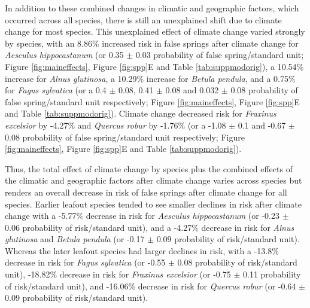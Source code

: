 \documentclass{article}\usepackage[]{graphicx}\usepackage[]{color}
\begin{document}
In addition to these combined changes in climatic and geographic factors, which occurred across all species, there is still an unexplained shift due to climate change for most species. This unexplained effect of climate change varied strongly by species, with an 8.86\% increased risk in false springs after climate change for \textit{Aesculus hippocastanum} (or 0.35 $\pm$ 0.03 probability of false spring/standard unit; Figure \ref{fig:maineffects}, Figure \ref{fig:spp}E and Table \ref{tab:suppmodorig}), a 10.54\% increase for \textit{Alnus glutinosa}, a 10.29\% increase for \textit{Betula pendula}, and a 0.75\% for \textit{Fagus sylvatica} (or a 0.4 $\pm$ 0.08, 0.41 $\pm$ 0.08 and 0.032 $\pm$ 0.08 probability of false spring/standard unit respectively; Figure \ref{fig:maineffects}, Figure \ref{fig:spp}E and Table \ref{tab:suppmodorig}). Climate change decreased risk for \textit{Fraxinus excelsior} by -4.27\% and \textit{Quercus robur} by -1.76\% (or a -1.08 $\pm$ 0.1 and -0.67 $\pm$ 0.08 probability of false spring/standard unit respectively; Figure \ref{fig:maineffects}, Figure \ref{fig:spp}E and Table \ref{tab:suppmodorig}).

Thus, the total effect of climate change by species plus the combined effects of the climatic and geographic factors after climate change varies across species but renders an overall decrease in risk of false springs after climate change for all species. Earlier leafout species tended to see smaller declines in risk after climate change with a -5.77\% decrease in risk for \textit{Aesculus hippocastanum} (or -0.23 $\pm$ 0.06 probability of risk/standard unit), and a -4.27\% decrease in risk for \textit{Alnus glutinosa} and \textit{Betula pendula} (or -0.17 $\pm$ 0.09 probability of risk/standard unit). Whereas the later leafout species had larger declines in risk, with a -13.8\% decrease in risk for \textit{Fagus sylvatica} (or -0.55 $\pm$ 0.08 probability of risk/standard unit), -18.82\% decrease in risk for \textit{Fraxinus excelsior} (or -0.75 $\pm$ 0.11 probability of risk/standard unit), and -16.06\% decrease in risk for \textit{Quercus robur} (or -0.64 $\pm$ 0.09 probability of risk/standard unit).  
\end{document}
